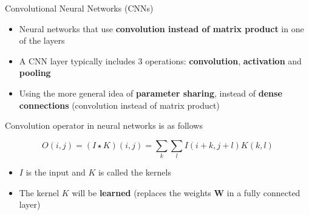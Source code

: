 \begin{frame}{Convolutional Neural Networks (CNNs)}
	\begin{itemize}
		\item Neural networks that use \textbf{convolution instead of matrix product} in one of the layers

		\medskip

		\item A CNN layer typically includes 3 operations: \textbf{convolution}, \textbf{activation} and \textbf{pooling}

		\medskip

		\item Using the more general idea of \textbf{parameter sharing}, instead of \textbf{dense connections} (convolution instead of matrix product)
	\end{itemize}

	\bigskip

	Convolution operator in neural networks is as follows

	\begin{equation*}
		O(i, j) = (I \star K)(i, j) = \sum_{k} \sum_{l} I(i + k, j + l) K(k, l)
	\end{equation*}
	\begin{itemize}
		\item $I$ is the input and $K$ is called the kernels
		\item The kernel $K$ will be \textbf{learned} (replaces the weights $\mathbf{W}$ in a fully connected layer)
	\end{itemize}
\end{frame}

